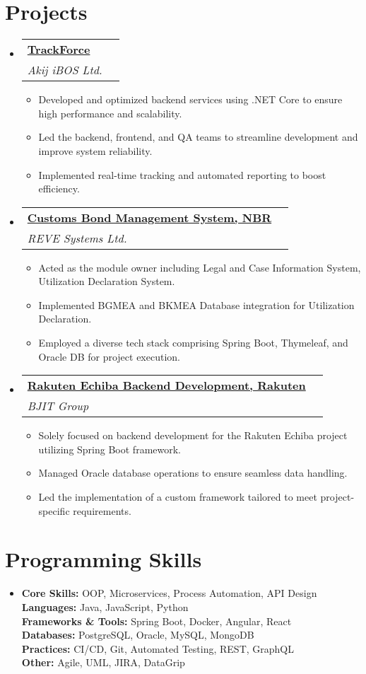 \documentclass[a4paper,11pt]{article}
\makeatletter
\newcommand{\resumeItem}[1]{\item[$\bullet$] \small{#1 \vspace{-2pt}}}
\newcommand{\resumeSubHeadingListStart}{\begin{itemize}[leftmargin=0pt, label={}]}
\newcommand{\resumeSubHeadingListEnd}{\end{itemize}}
\newcommand{\resumeItemListStart}{\begin{itemize}}
\newcommand{\resumeItemListEnd}{\end{itemize}\vspace{-5pt}}
\newcommand{\resumeSubheading}[5]{
    \vspace{-1pt}\item
    \begin{tabular*}{1\textwidth}{l@{\extracolsep{\fill}}r}
    \textbf{\href{#4}{#1}} & #2 \\
    \textit{\small#3} & \textit{\small #5} \\
    \end{tabular*}\vspace{-5pt}
}
\makeatother
\begin{document}
    \section{Projects}
    \resumeSubHeadingListStart
    \resumeSubheading
    {TrackForce}{}
    {Akij iBOS Ltd.}{https://app.trackforce.io/}{}
    \resumeItemListStart
    \resumeItem{Developed and optimized backend services using .NET Core to ensure high performance and scalability.}
    \resumeItem{Led the backend, frontend, and QA teams to streamline development and improve system reliability.}
    \resumeItem{Implemented real-time tracking and automated reporting to boost efficiency.}
    \resumeItemListEnd
    \resumeSubheading
    {Customs Bond Management System, NBR}{}
    {REVE Systems Ltd.}{https://cusbond.gov.bd/}{}
    \resumeItemListStart
    \resumeItem{Acted as the module owner including Legal and Case Information System, Utilization Declaration System.}
    \resumeItem{Implemented BGMEA and BKMEA Database integration for Utilization Declaration.}
    \resumeItem{Employed a diverse tech stack comprising Spring Boot, Thymeleaf, and Oracle DB for project execution.}
    \resumeItemListEnd
    \resumeSubheading
    {Rakuten Echiba Backend Development, Rakuten}{}
    {BJIT Group}{https://www.rakuten.co.jp/}{}
    \resumeItemListStart
    \resumeItem{Solely focused on backend development for the Rakuten Echiba project utilizing Spring Boot framework.}
    \resumeItem{Managed Oracle database operations to ensure seamless data handling.}
    \resumeItem{Led the implementation of a custom framework tailored to meet project-specific requirements.}
    \resumeItemListEnd
    \resumeSubHeadingListEnd



    \section{Programming Skills}
    \resumeSubHeadingListStart
    \item{
        \textbf{Core Skills:} OOP, Microservices, Process Automation, API Design \\
        \textbf{Languages:} Java, JavaScript, Python \\
        \textbf{Frameworks \& Tools:} Spring Boot, Docker, Angular, React \\
        \textbf{Databases:} PostgreSQL, Oracle, MySQL, MongoDB \\
        \textbf{Practices:} CI/CD, Git, Automated Testing, REST, GraphQL \\
        \textbf{Other:} Agile, UML, JIRA, DataGrip
    }
    \resumeSubHeadingListEnd
\end{document}
